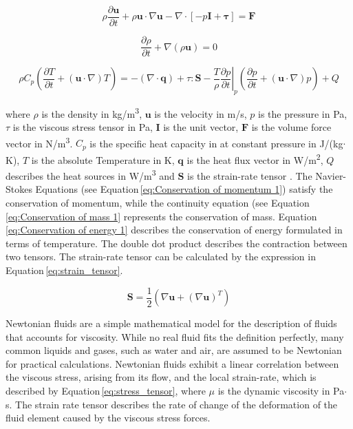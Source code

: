 \begin{equation}
\rho\frac{\partial \boldsymbol u}{\partial t} + \rho\boldsymbol u\cdotp\nabla\boldsymbol u - \nabla\cdotp[-p\boldsymbol I + \boldsymbol \tau] = \boldsymbol F
\label{eq:Conservation of momentum 1}
\end{equation}


\begin{equation}
\frac{\partial\rho}{\partial t}+\nabla(\rho\boldsymbol u) = 0
\label{eq:Conservation of mass 1}
\end{equation}

\begin{equation}
\rho C_{p}\left(\frac{\partial T}{\partial t}+(\boldsymbol u \cdotp\nabla)T\right) = -(\nabla\cdotp\boldsymbol q)+\tau:\boldsymbol S -\frac{T}{\rho}\left.\frac{\partial p}{\partial t}\right\vert_{p}\left(\frac{\partial p}{\partial t}+(\boldsymbol u\cdotp\nabla)p\right)+Q 
\label{eq:Conservation of energy 1}
\end{equation}

where $\rho$ is the density in kg/m\textsuperscript{3}, $\boldsymbol u$ is the velocity in m/s, $p$ is the pressure in Pa, $\tau$ is the viscous stress tensor in Pa, $\boldsymbol I$ is the unit vector, $\boldsymbol F$ is the volume force vector in N/m\textsuperscript{3}. $C_{p}$ is the specific heat capacity in at constant pressure in J/(kg$\cdotp$K), $T$ is the absolute Temperature in K, $\boldsymbol q$ is the heat flux vector in W/m\textsuperscript{2}, $Q$ describes the heat sources in W/m\textsuperscript{3} and $\boldsymbol S$ is the strain-rate tensor \cite{ComsolRefManual}. The Navier-Stokes Equations (see Equation\,\ref{eq:Conservation of momentum 1}) satisfy the conservation of momentum, while the continuity equation (see Equation\,\ref{eq:Conservation of mass 1} represents the conservation of mass. Equation\,\ref{eq:Conservation of energy 1} describes the conservation of energy formulated in terms of temperature. The double dot product describes the contraction between two tensors. The strain-rate tensor can be calculated by the expression in Equation\,\ref{eq:strain_tensor}\cite{ComsolRefManual}.

\begin{equation}
\boldsymbol S = \frac{1}{2}(\nabla\boldsymbol u+(\nabla\boldsymbol u)^{T})
\label{eq:strain_tensor}
\end{equation}

Newtonian fluids are a simple mathematical model for the description of fluids that accounts for viscosity. While no real fluid fits the definition perfectly, many common liquids and gases, such as water and air, are assumed to be Newtonian for practical calculations. Newtonian fluids exhibit a linear correlation between the viscous stress, arising from its flow, and the local strain-rate, which is described by Equation\,\ref{eq:stress_tensor}, where $\mu$ is the dynamic viscosity in Pa$\cdotp$s. The strain rate tensor describes the rate of change of the deformation of the fluid element caused by the viscous stress forces.


